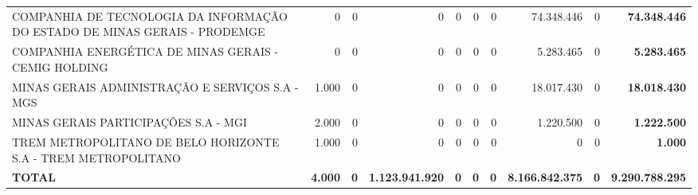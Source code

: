 \documentclass{article}
\begin{document}
\begin{longtable}[c]{m{2.0cm}|m{1.35cm}|m{1.35cm}|m{1.35cm}|m{1.35cm}|m{1.35cm}|m{1.35cm}|m{1.35cm}|m{1.35cm}|m{1.0cm}}
\multicolumn{1}{L{4cm}|}{COMPANHIA DE TECNOLOGIA DA INFORMAÇÃO DO ESTADO DE MINAS GERAIS - PRODEMGE} & \multicolumn{1}{r|}{    0} & \multicolumn{1}{r|}{0} & \multicolumn{1}{r|}{            0} & \multicolumn{1}{r|}{0} & \multicolumn{1}{r|}{0} & \multicolumn{1}{r|}{0} & \multicolumn{1}{r|}{74.348.446} & \multicolumn{1}{r|}{0} & \multicolumn{1}{r}{ \textbf{74.348.446}} \\
\multicolumn{1}{L{4cm}|}{COMPANHIA ENERGÉTICA DE MINAS GERAIS - CEMIG HOLDING} & \multicolumn{1}{r|}{    0} & \multicolumn{1}{r|}{0} & \multicolumn{1}{r|}{            0} & \multicolumn{1}{r|}{0} & \multicolumn{1}{r|}{0} & \multicolumn{1}{r|}{0} & \multicolumn{1}{r|}{5.283.465} & \multicolumn{1}{r|}{0} & \multicolumn{1}{r}{ \textbf{5.283.465}} \\
\multicolumn{1}{L{4cm}|}{MINAS GERAIS ADMINISTRAÇÃO E SERVIÇOS S.A - MGS} & \multicolumn{1}{r|}{1.000} & \multicolumn{1}{r|}{0} & \multicolumn{1}{r|}{            0} & \multicolumn{1}{r|}{0} & \multicolumn{1}{r|}{0} & \multicolumn{1}{r|}{0} & \multicolumn{1}{r|}{18.017.430} & \multicolumn{1}{r|}{0} & \multicolumn{1}{r}{ \textbf{18.018.430}} \\
\multicolumn{1}{L{4cm}|}{MINAS GERAIS PARTICIPAÇÕES S.A - MGI} & \multicolumn{1}{r|}{2.000} & \multicolumn{1}{r|}{0} & \multicolumn{1}{r|}{            0} & \multicolumn{1}{r|}{0} & \multicolumn{1}{r|}{0} & \multicolumn{1}{r|}{0} & \multicolumn{1}{r|}{1.220.500} & \multicolumn{1}{r|}{0} & \multicolumn{1}{r}{ \textbf{1.222.500}} \\
\multicolumn{1}{L{4cm}|}{TREM METROPOLITANO DE BELO HORIZONTE S.A - TREM METROPOLITANO} & \multicolumn{1}{r|}{1.000} & \multicolumn{1}{r|}{0} & \multicolumn{1}{r|}{            0} & \multicolumn{1}{r|}{0} & \multicolumn{1}{r|}{0} & \multicolumn{1}{r|}{0} & \multicolumn{1}{r|}{            0} & \multicolumn{1}{r|}{0} & \multicolumn{1}{r}{ \textbf{1.000}} \\
\hline
\multicolumn{1}{L{4cm}|}{ \textbf{TOTAL}} & \multicolumn{1}{r|}{ \textbf{4.000}} & \multicolumn{1}{r|}{ \textbf{0}} & \multicolumn{1}{r|}{ \textbf{1.123.941.920}} & \multicolumn{1}{r|}{ \textbf{0}} & \multicolumn{1}{r|}{ \textbf{0}} & \multicolumn{1}{r|}{ \textbf{0}} & \multicolumn{1}{r|}{ \textbf{8.166.842.375}} & \multicolumn{1}{r|}{ \textbf{0}} & \multicolumn{1}{r}{ \textbf{9.290.788.295}} \\
\end{longtable}
\newpage
{}
\end{document}
